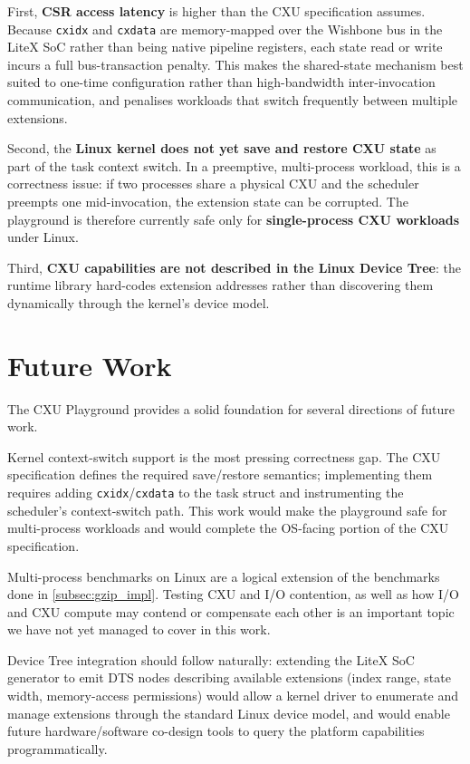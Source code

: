 First, \textbf{CSR access latency} is higher than the CXU specification assumes.
Because \texttt{cxidx} and \texttt{cxdata} are memory-mapped over the Wishbone
bus in the LiteX SoC rather than being native pipeline registers, each state read
or write incurs a full bus-transaction penalty. This makes the shared-state
mechanism best suited to one-time configuration rather than high-bandwidth
inter-invocation communication, and penalises workloads that switch frequently
between multiple extensions.

Second, the \textbf{Linux kernel does not yet save and restore CXU state} as part
of the task context switch. In a preemptive, multi-process workload, this is a
correctness issue: if two processes share a physical CXU and the scheduler
preempts one mid-invocation, the extension state can be corrupted. The playground
is therefore currently safe only for \textbf{single-process CXU workloads} under Linux.

Third, \textbf{CXU capabilities are not described in the Linux Device Tree}: the
runtime library hard-codes extension addresses rather than discovering them
dynamically through the kernel's device model.

\section{Future Work} 
\label{sec:future_work}

The CXU Playground provides a solid foundation for several directions of future
work.

Kernel context-switch support is the most pressing correctness gap. The
CXU specification defines the required save/restore semantics; implementing them
requires adding \texttt{cxidx}/\texttt{cxdata} to the task struct and instrumenting
the scheduler's context-switch path. This work would make the playground safe for
multi-process workloads and would complete the OS-facing portion of the CXU
specification.

Multi-process benchmarks on Linux are a logical extension of the benchmarks
done in \autoref{subsec:gzip_impl}. Testing CXU and I/O contention, as well
as how I/O and CXU compute may contend or compensate each other is an important
topic we have not yet managed to cover in this work.

Device Tree integration should follow naturally: extending the LiteX SoC
generator to emit DTS nodes describing available extensions (index range, state
width, memory-access permissions) would allow a kernel driver to enumerate and
manage extensions through the standard Linux device model, and would enable
future hardware/software co-design tools to query the platform capabilities
programmatically.

